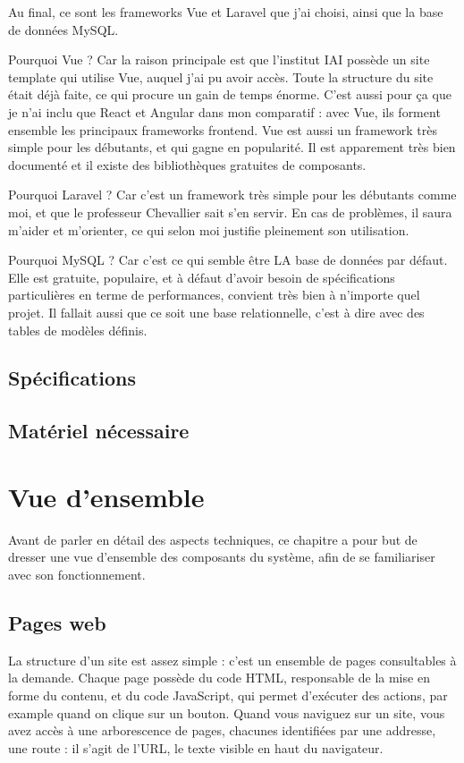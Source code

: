 \documentclass[
    iai, %
    eai, %
]{heig-tb}
\begin{document}
Au final, ce sont les frameworks Vue et Laravel que j'ai choisi, ainsi que la base de données MySQL.

Pourquoi Vue ? Car la raison principale est que l'institut IAI possède un site template qui utilise Vue, auquel j'ai pu avoir accès.
Toute la structure du site était déjà faite, ce qui procure un gain de temps énorme.
C'est aussi pour ça que je n'ai inclu que React et Angular dans mon comparatif : avec Vue, ils forment ensemble les principaux frameworks frontend.
Vue est aussi un framework très simple pour les débutants, et qui gagne en popularité.
Il est apparement très bien documenté et il existe des bibliothèques gratuites de composants.

Pourquoi Laravel ? Car c'est un framework très simple pour les débutants comme moi, et que le professeur Chevallier sait s'en servir.
En cas de problèmes, il saura m'aider et m'orienter, ce qui selon moi justifie pleinement son utilisation.

Pourquoi MySQL ? Car c'est ce qui semble être LA base de données par défaut. Elle est gratuite, populaire, et à défaut d'avoir besoin de spécifications particulières en terme de performances, convient très bien à n'importe quel projet.
Il fallait aussi que ce soit une base relationnelle, c'est à dire avec des tables de modèles définis.


\section{Spécifications}
\section{Matériel nécessaire}
\chapter{Vue d'ensemble}

Avant de parler en détail des aspects techniques, ce chapitre a pour but de dresser une vue d'ensemble des composants du système, afin de se familiariser avec son fonctionnement.

\section{Pages web}

La structure d'un site est assez simple : c'est un ensemble de pages consultables à la demande. Chaque page possède du code HTML, responsable de la mise en forme du contenu, et du code JavaScript, qui permet d'exécuter des actions, par example quand on clique sur un bouton.
Quand vous naviguez sur un site, vous avez accès à une arborescence de pages, chacunes identifiées par une addresse, une route : il s'agit de l'URL, le texte visible en haut du navigateur.
\end{document}
